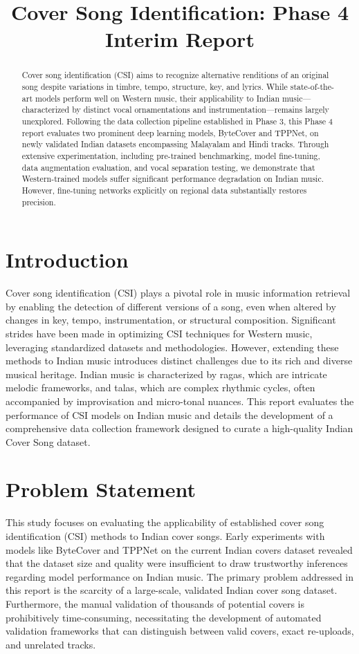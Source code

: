 \documentclass[conference]{IEEEtran}
\title{Cover Song Identification: Phase 4 Interim Report}
\author{
    \IEEEauthorblockN{Rojin Raju \\ Guided by: Dr. Joe Cheri Ross}
    \IEEEauthorblockA{\textit{National Institute of Technology, Calicut}}
}
\begin{document}
\maketitle

\begin{abstract}
Cover song identification (CSI) aims to recognize alternative renditions of an original song despite variations in timbre, tempo, structure, key, and lyrics. While state-of-the-art models perform well on Western music, their applicability to Indian music—characterized by distinct vocal ornamentations and instrumentation—remains largely unexplored. Following the data collection pipeline established in Phase 3, this Phase 4 report evaluates two prominent deep learning models, ByteCover and TPPNet, on newly validated Indian datasets encompassing Malayalam and Hindi tracks. Through extensive experimentation, including pre-trained benchmarking, model fine-tuning, data augmentation evaluation, and vocal separation testing, we demonstrate that Western-trained models suffer significant performance degradation on Indian music. However, fine-tuning networks explicitly on regional data substantially restores precision. 
\end{abstract}


\section{Introduction}
Cover song identification (CSI) plays a pivotal role in music information retrieval by enabling the detection of different versions of a song, even when altered by changes in key, tempo, instrumentation, or structural composition. Significant strides have been made in optimizing CSI techniques for Western music, leveraging standardized datasets and methodologies. However, extending these methods to Indian music introduces distinct challenges due to its rich and diverse musical heritage. Indian music is characterized by ragas, which are intricate melodic frameworks, and talas, which are complex rhythmic cycles, often accompanied by improvisation and micro-tonal nuances. This report evaluates the performance of CSI models on Indian music and details the development of a comprehensive data collection framework designed to curate a high-quality Indian Cover Song dataset.

\section{Problem Statement}
This study focuses on evaluating the applicability of established cover song identification (CSI) methods to Indian cover songs. Early experiments with models like ByteCover and TPPNet on the current Indian covers dataset revealed that the dataset size and quality were insufficient to draw trustworthy inferences regarding model performance on Indian music. The primary problem addressed in this report is the scarcity of a large-scale, validated Indian cover song dataset. Furthermore, the manual validation of thousands of potential covers is prohibitively time-consuming, necessitating the development of automated validation frameworks that can distinguish between valid covers, exact re-uploads, and unrelated tracks.
\end{document}

